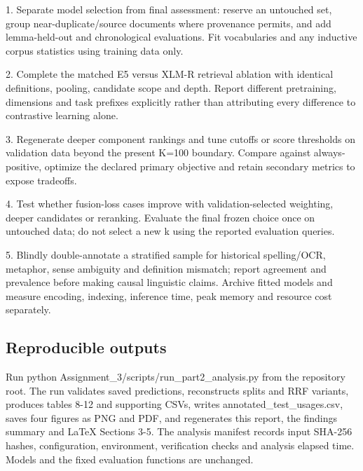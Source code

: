 1. Separate model selection from final assessment: reserve an untouched set, group near-duplicate/source documents where provenance permits, and add lemma-held-out and chronological evaluations. Fit vocabularies and any inductive corpus statistics using training data only.

2. Complete the matched E5 versus XLM-R retrieval ablation with identical definitions, pooling, candidate scope and depth. Report different pretraining, dimensions and task prefixes explicitly rather than attributing every difference to contrastive learning alone.

3. Regenerate deeper component rankings and tune cutoffs or score thresholds on validation data beyond the present K=100 boundary. Compare against always-positive, optimize the declared primary objective and retain secondary metrics to expose tradeoffs.

4. Test whether fusion-loss cases improve with validation-selected weighting, deeper candidates or reranking. Evaluate the final frozen choice once on untouched data; do not select a new k using the reported evaluation queries.

5. Blindly double-annotate a stratified sample for historical spelling/OCR, metaphor, sense ambiguity and definition mismatch; report agreement and prevalence before making causal linguistic claims. Archive fitted models and measure encoding, indexing, inference time, peak memory and resource cost separately.

\subsection{Reproducible outputs}
Run python Assignment\_3/scripts/run\_part2\_analysis.py from the repository root. The run validates saved predictions, reconstructs splits and RRF variants, produces tables 8-12 and supporting CSVs, writes annotated\_test\_usages.csv, saves four figures as PNG and PDF, and regenerates this report, the findings summary and LaTeX Sections 3-5. The analysis manifest records input SHA-256 hashes, configuration, environment, verification checks and analysis elapsed time. Models and the fixed evaluation functions are unchanged.

